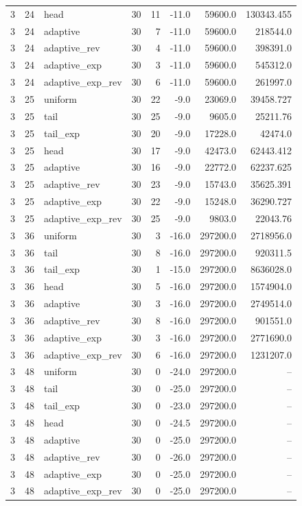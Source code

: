 \begin{tabular}{rrlrrrrr}
3 & 24 & head & 30 & 11 & -11.0 & 59600.0 & 130343.455 \\
3 & 24 & adaptive & 30 & 7 & -11.0 & 59600.0 & 218544.0 \\
3 & 24 & adaptive\_rev & 30 & 4 & -11.0 & 59600.0 & 398391.0 \\
3 & 24 & adaptive\_exp & 30 & 3 & -11.0 & 59600.0 & 545312.0 \\
3 & 24 & adaptive\_exp\_rev & 30 & 6 & -11.0 & 59600.0 & 261997.0 \\
3 & 25 & uniform & 30 & 22 & -9.0 & 23069.0 & 39458.727 \\
3 & 25 & tail & 30 & 25 & -9.0 & 9605.0 & 25211.76 \\
3 & 25 & tail\_exp & 30 & 20 & -9.0 & 17228.0 & 42474.0 \\
3 & 25 & head & 30 & 17 & -9.0 & 42473.0 & 62443.412 \\
3 & 25 & adaptive & 30 & 16 & -9.0 & 22772.0 & 62237.625 \\
3 & 25 & adaptive\_rev & 30 & 23 & -9.0 & 15743.0 & 35625.391 \\
3 & 25 & adaptive\_exp & 30 & 22 & -9.0 & 15248.0 & 36290.727 \\
3 & 25 & adaptive\_exp\_rev & 30 & 25 & -9.0 & 9803.0 & 22043.76 \\
3 & 36 & uniform & 30 & 3 & -16.0 & 297200.0 & 2718956.0 \\
3 & 36 & tail & 30 & 8 & -16.0 & 297200.0 & 920311.5 \\
3 & 36 & tail\_exp & 30 & 1 & -15.0 & 297200.0 & 8636028.0 \\
3 & 36 & head & 30 & 5 & -16.0 & 297200.0 & 1574904.0 \\
3 & 36 & adaptive & 30 & 3 & -16.0 & 297200.0 & 2749514.0 \\
3 & 36 & adaptive\_rev & 30 & 8 & -16.0 & 297200.0 & 901551.0 \\
3 & 36 & adaptive\_exp & 30 & 3 & -16.0 & 297200.0 & 2771690.0 \\
3 & 36 & adaptive\_exp\_rev & 30 & 6 & -16.0 & 297200.0 & 1231207.0 \\
3 & 48 & uniform & 30 & 0 & -24.0 & 297200.0 & -- \\
3 & 48 & tail & 30 & 0 & -25.0 & 297200.0 & -- \\
3 & 48 & tail\_exp & 30 & 0 & -23.0 & 297200.0 & -- \\
3 & 48 & head & 30 & 0 & -24.5 & 297200.0 & -- \\
3 & 48 & adaptive & 30 & 0 & -25.0 & 297200.0 & -- \\
3 & 48 & adaptive\_rev & 30 & 0 & -26.0 & 297200.0 & -- \\
3 & 48 & adaptive\_exp & 30 & 0 & -25.0 & 297200.0 & -- \\
3 & 48 & adaptive\_exp\_rev & 30 & 0 & -25.0 & 297200.0 & -- \\
\hline
\end{tabular}
